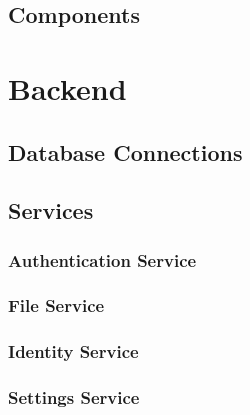 \subsection{Components}

\section{Backend}

\subsection{Database Connections}

\subsection{Services}

\subsubsection{Authentication Service}

\subsubsection{File Service}

\subsubsection{Identity Service}

\subsubsection{Settings Service}
